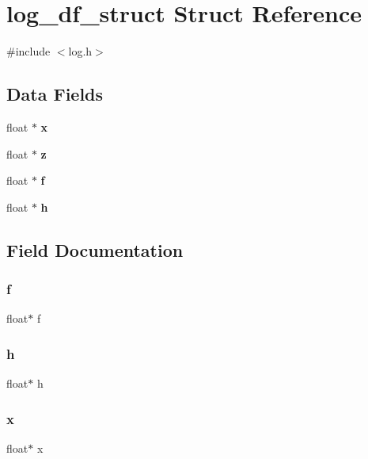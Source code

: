 \section{log\+\_\+df\+\_\+struct Struct Reference}
\label{structlog__df__struct}


{\ttfamily \#include $<$log.\+h$>$}

\subsection*{Data Fields}
\begin{DoxyCompactItemize}
\item 
float $\ast$ \textbf{ x}
\item 
float $\ast$ \textbf{ z}
\item 
float $\ast$ \textbf{ f}
\item 
float $\ast$ \textbf{ h}
\end{DoxyCompactItemize}


\subsection{Field Documentation}
\mbox{\label{structlog__df__struct_ab64c58141e78e6560c4ee83a8d3e17be}} 
\subsubsection{f}
{\footnotesize\ttfamily float$\ast$ f}

\mbox{\label{structlog__df__struct_a8098dd79fc329ed864e98f5045648220}} 
\subsubsection{h}
{\footnotesize\ttfamily float$\ast$ h}

\mbox{\label{structlog__df__struct_a51262fa06c263b0dfd25c45b80656f24}} 
\subsubsection{x}
{\footnotesize\ttfamily float$\ast$ x}

